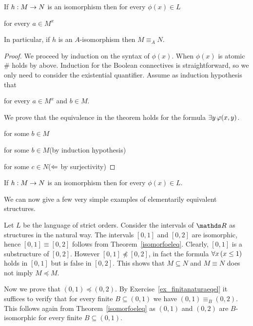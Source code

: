\begin{theorem}\label{isomorfoeleq}
If $h:M\rightarrow N$ is an isomorphism then for every $\phi(x)\in L$

 for every $a\in M^x$

In particular, if $h$ is an $A$-isomorphism then $M\equiv_A N$.
\end{theorem}

\begin{proof}
  We proceed by induction on the syntax of $\phi(x)$.
  When $\phi(x)$ is atomic \# holds by  above.
  Induction for the Boolean connectives is straightforward, so we only need to consider the existential quantifier.
  Assume as induction hypothesis that


   for every $a\in M^x$ and $b\in M$.

We prove that the equivalence in the theorem holds for the formula $\exists y\,\varphi(x,y)$.

 for some $b\in M$

 for some $b\in M$\hfill (by induction hypothesis)

for some $c\in N$\hfill ($\Leftarrow$ by surjectivity)

\end{proof}


\begin{corollary}\label{corol_def_set_invariant}
If $h:M\rightarrow N$ is an isomorphism then for every $\phi(x)\in L$.

\end{corollary}

We can now give a few very simple examples of elementarily equivalent structures.

\begin{example}\label{expl_ordini_elem}
Let $L$ be the language of strict orders.
Consider the intervals of $\RR$ as structures in the natural way.
The intervals $[0,1]$ and $[0,2]$ are isomorphic, hence $[0,1]\equiv[0,2]$ follows from Theorem~\ref{isomorfoeleq}.
Clearly, $[0,1]$ is a substructure of $[0,2]$.
However $[0,1]\npreceq [0,2]$, in fact the formula $\forall  x\,(x\le1)$ holds in $[0,1]$ but is false in $[0,2]$.
This shows that $M\subseteq N$ and $M\equiv N$ does not imply $M\preceq M$.

Now we prove that $(0,1)\preceq (0,2)$.
By Exercise~\ref{ex_finitanaturaeqel} it suffices to verify that for every finite $B\subseteq(0,1)$ we have $(0,1)\equiv_B  (0,2)$.
This follows again from Theorem~\ref{isomorfoeleq} as $(0,1)$ and $(0,2)$ are $B$-isomorphic for every finite $B\subseteq(0,1)$.
\end{example}


